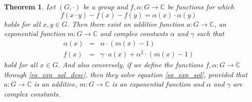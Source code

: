 \documentclass[a4paper,12pt]{article}
\theoremstyle{plain}
\newtheorem{thm}{Theorem}
\theoremstyle{definition}
\theoremstyle{remark}
\begin{document}
\begin{thm}\label{thm_exp_sol}
 Let $(G, \cdot)$ be a group and $f, \alpha \colon G\to \mathbb{C}$ be functions for which 
 \begin{equation}\label{eq_exp_sol}
  f(x\cdot y)-f(x)-f(y)= \alpha(x)\cdot \alpha(y)
 \end{equation}
 holds for all $x, y\in G$. Then there exist an additive function $a\colon G\to \mathbb{C}$, an exponential function $m\colon G\to \mathbb{C}$ and complex constants 
 $\alpha$ and $\gamma$ such that 
 \begin{equation}\label{eq_exp_sol_desc}
 \begin{array}{rcl}
 \alpha(x)&=& \alpha\cdot (m(x)-1)\\
  f(x)&=& \gamma \cdot a(x)+\alpha^{2}\cdot (m(x)-1)
  \end{array}
   \end{equation}
 hold for all $x\in G$. And also conversely, if we define the functions $f, \alpha \colon G\to \mathbb{C}$ through \eqref{eq_exp_sol_desc}, then they solve equation \eqref{eq_exp_sol}, provided that $a\colon G\to \mathbb{C}$ is an additive, $m\colon G\to \mathbb{C}$ is an exponential function and $\alpha$ and $\gamma$ are complex constants.  
\end{thm}
\end{document}

